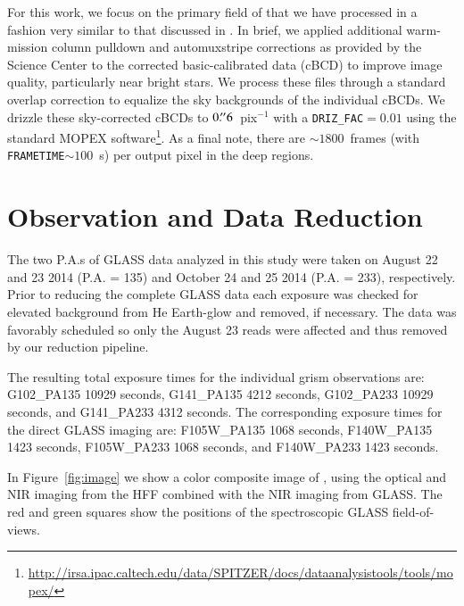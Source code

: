 For this work, we focus on the primary field of \cler that we have processed in a fashion very similar to that
discussed in \citet{2014ApJ...785..108B,2014ApJ...786L...4R,2015arXiv150402099H}.  In brief, we applied
additional warm-mission column pulldown and automuxstripe corrections as provided by the \spitzer Science Center
to the corrected basic-calibrated data (cBCD) to improve image quality, particularly near bright stars.  We
process these files through a standard overlap correction to equalize the sky backgrounds of the individual
cBCDs.  We drizzle these sky-corrected cBCDs to $0\mbox{$.\!^{\prime\prime}$}6$~pix$^{-1}$ with a \texttt{DRIZ\_FAC}$=\!0.01$ using
the standard MOPEX
software\footnote{\url{http://irsa.ipac.caltech.edu/data/SPITZER/docs/dataanalysistools/tools/mopex/}}.  As a
final note, there are $\sim\!1800$~frames (with \texttt{FRAMETIME}$\sim\!100$~s) per output pixel in the deep
regions.


\section{\glass Observation and Data Reduction}
\label{sec:datareduction}

The two P.A.s of GLASS data analyzed in this study were 
taken on August 22 and 23 2014 (P.A. = 135) %
and October 24 and 25 2014 (P.A. = 233), respectively. %
Prior to reducing the complete GLASS data each exposure was checked for elevated background from He Earth-glow 
\citep{Brammer:2014p34990} and removed, if necessary. The \cler data was favorably scheduled so only the August 23 reads were 
affected and thus removed by our reduction pipeline.

The resulting total exposure times for the individual grism observations are: G102\_PA135 10929 seconds,
G141\_PA135 4212 seconds,
G102\_PA233 10929 seconds, and
G141\_PA233 4312 seconds.
The corresponding exposure times for the direct GLASS imaging are:
F105W\_PA135 1068 seconds,
F140W\_PA135 1423 seconds,
F105W\_PA233 1068 seconds, and
F140W\_PA233 1423 seconds.

In Figure~\ref{fig:image} we show a color composite image of \cler,
using the optical and NIR imaging from the HFF combined with the NIR imaging from GLASS.
The red and green squares show the positions of the spectroscopic GLASS \cler field-of-views.

